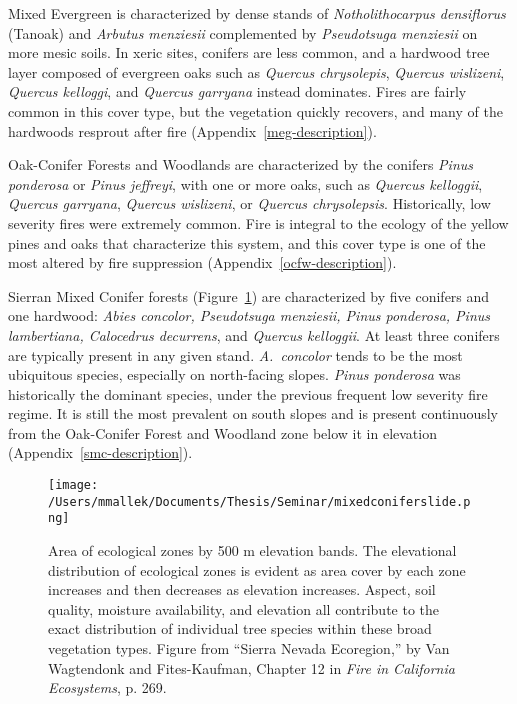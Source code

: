 Mixed Evergreen is characterized by dense stands of \emph{Notholithocarpus densiflorus} (Tanoak) and \emph{Arbutus menziesii} complemented by \emph{Pseudotsuga menziesii} on more mesic soils. In xeric sites, conifers are less common, and a hardwood tree layer composed of evergreen oaks such as \emph{Quercus chrysolepis}, \emph{Quercus wislizeni}, \emph{Quercus kelloggi}, and \emph{Quercus garryana} instead dominates. Fires are fairly common in this cover type, but the vegetation quickly recovers, and many of the hardwoods resprout after fire (Appendix~\ref{meg-description}). 

Oak-Conifer Forests and Woodlands are characterized by the conifers \emph{Pinus ponderosa} or \emph{Pinus jeffreyi}, with one or more oaks, such as \emph{Quercus kelloggii}, \emph{Quercus garryana}, \emph{Quercus wislizeni}, or \emph{Quercus chrysolepsis}. Historically, low severity fires were extremely common. Fire is integral to the ecology of the yellow pines and oaks that characterize this system, and this cover type is one of the most altered by fire suppression (Appendix~\ref{ocfw-description}).

Sierran Mixed Conifer forests (Figure~\ref{fig:smctrees}) are characterized by five conifers and one hardwood: \emph{Abies concolor, Pseudotsuga menziesii, Pinus ponderosa, Pinus lambertiana, Calocedrus decurrens}, and \emph{Quercus kelloggii}. At least three conifers are typically present in any given stand. \emph{A.~concolor} tends to be the most ubiquitous species, especially on north-facing slopes. \emph{Pinus ponderosa} was historically the dominant species, under the previous frequent low severity fire regime. It is still the most prevalent on south slopes and is present continuously from the Oak-Conifer Forest and Woodland zone below it in elevation (Appendix~\ref{smc-description}).

\begin{figure}[!htbp]
\centering
\texttt{[image: /Users/mmallek/Documents/Thesis/Seminar/mixedconiferslide.png]}
\caption{Area of ecological zones by 500 m elevation bands. The elevational distribution of ecological zones is evident as area cover by each zone increases and then decreases as elevation increases. Aspect, soil quality, moisture availability, and elevation all contribute to the exact distribution of individual tree species within these broad vegetation types. Figure from ``Sierra Nevada Ecoregion,'' by Van Wagtendonk and Fites-Kaufman, Chapter 12 in \emph{Fire in California Ecosystems}, p. 269.}
\label{fig:smctrees}
\end{figure}


